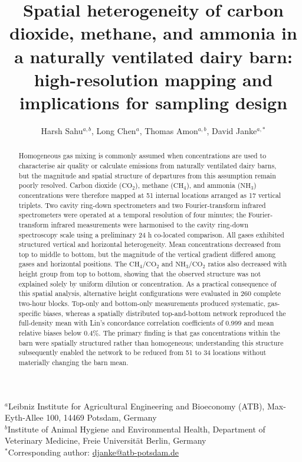 \documentclass[12pt,a4paper]{article}
\title{Spatial heterogeneity of carbon dioxide, methane, and ammonia in a naturally ventilated dairy barn: high-resolution mapping and implications for sampling design}
\author{
Harsh Sahu$^{a,b}$,
Long Chen$^{a}$,
Thomas Amon$^{a,b}$,
David Janke$^{a,*}$
}
\date{}
\begin{document}
\maketitle

\begin{center}
\small
$^{a}$Leibniz Institute for Agricultural Engineering and Bioeconomy (ATB),
Max-Eyth-Allee 100, 14469 Potsdam, Germany\\
$^{b}$Institute of Animal Hygiene and Environmental Health, Department of
Veterinary Medicine, Freie Universit\"at Berlin, Germany\\
$^{*}$Corresponding author: \href{mailto:djanke@atb-potsdam.de}{djanke@atb-potsdam.de}
\end{center}

\begin{abstract}
Homogeneous gas mixing is commonly assumed when concentrations are used to
characterise air quality or calculate emissions from naturally ventilated
dairy barns, but the magnitude and spatial structure of departures from this
assumption remain poorly resolved. Carbon dioxide (\(\mathrm{CO_2}\)),
methane (\(\mathrm{CH_4}\)), and ammonia (\(\mathrm{NH_3}\)) concentrations
were therefore mapped at 51 internal locations arranged as 17 vertical
triplets. Two cavity ring-down spectrometers and two Fourier-transform infrared
spectrometers were operated at a temporal resolution of four minutes; the
Fourier-transform infrared measurements were harmonised to the cavity
ring-down spectroscopy scale using a preliminary 24 h co-located comparison.
All gases exhibited structured vertical and horizontal heterogeneity. Mean
concentrations decreased from top to middle to bottom, but the magnitude of
the vertical gradient differed among gases and horizontal positions. The
\(\mathrm{CH_4}/\mathrm{CO_2}\) and
\(\mathrm{NH_3}/\mathrm{CO_2}\) ratios also decreased with height group from
top to bottom, showing that the observed structure was not explained solely by
uniform dilution or concentration. As a practical consequence of this spatial
analysis, alternative height configurations were evaluated in 260 complete
two-hour blocks. Top-only and bottom-only measurements produced systematic,
gas-specific biases, whereas a spatially distributed top-and-bottom network
reproduced the full-density mean with Lin's concordance correlation
coefficients of 0.999 and mean relative biases below 0.4\%. The primary finding
is that gas concentrations within the barn were spatially structured rather
than homogeneous; understanding this structure subsequently enabled the
network to be reduced from 51 to 34 locations without materially changing the
barn mean.
\end{abstract}
\end{document}
